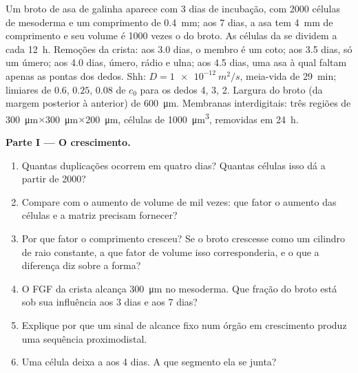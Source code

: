 \begin{problem}
\label{pb:b2:limb-organogenesis:1}
Um broto de asa de galinha aparece com 3 dias de incubação, com
\num{2000} células de mesoderma e um comprimento de \qty{0.4}{mm}; aos
7 dias, a asa tem \qty{4}{mm} de comprimento e seu volume é \num{1000}
vezes o do broto. As células da  se dividem a cada
\qty{12}{h}. Remoções da crista: aos 3.0 dias, o membro é um coto; aos
3.5 dias, só um úmero; aos 4.0 dias, úmero, rádio e ulna; aos 4.5 dias,
uma asa à qual faltam apenas as pontas dos dedos.
Shh: $D = \qty{1e-12}{m^2/s}$, meia-vida de \qty{29}{min}; limiares de
$0.6$, $0.25$, $0.08$ de $c_0$ para os dedos 4, 3, 2. Largura do broto
(da margem posterior à anterior) de \qty{600}{\micro m}. Membranas
interdigitais: três regiões de
\qty{300}{\micro m}$\times$\qty{300}{\micro m}$\times$\qty{200}{\micro m},
células de \qty{1000}{\micro m^3}, removidas em \qty{24}{h}.

\medskip
\noindent\textbf{Parte I --- O crescimento.}
\begin{enumerate}
  \item Quantas duplicações ocorrem em quatro dias? Quantas células
        isso dá a partir de \num{2000}?
  \item Compare com o aumento de volume de mil vezes: que fator o
        aumento das células e a matriz precisam fornecer?
  \item Por que fator o comprimento cresceu? Se o broto crescesse como
        um cilindro de raio constante, a que fator de volume isso
        corresponderia, e o que a diferença diz sobre a forma?
  \item O FGF da crista alcança \qty{300}{\micro m} no mesoderma. Que
        fração do broto está sob sua influência aos 3 dias e aos 7
        dias?
  \item Explique por que um sinal de alcance fixo num órgão em
        crescimento produz uma sequência proximodistal.
  \item Uma célula deixa a  aos 4 dias. A que segmento
        ela se junta?
\end{enumerate}


\end{problem}
